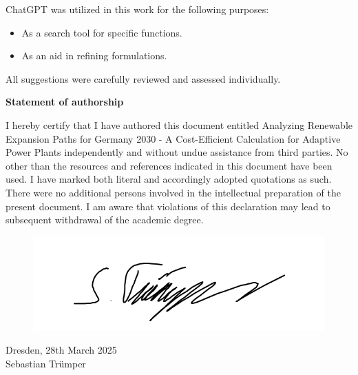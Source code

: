 ChatGPT was utilized in this work for the following purposes:
\begin{itemize}
    \item As a search tool for specific functions.
    \item As an aid in refining formulations.
\end{itemize}
All suggestions were carefully reviewed and assessed individually.
    


\begin{center}
\textbf{Statement of authorship}
\end{center}

I hereby certify that I have authored this document entitled Analyzing Renewable Expansion
Paths for Germany 2030 - A Cost-Efficient Calculation for Adaptive Power Plants independently
and without undue assistance from third parties. No other than the resources and references
indicated in this document have been used. I have marked both literal and accordingly adopted
quotations as such. There were no additional persons involved in the intellectual preparation
of the present document. I am aware that violations of this declaration may lead to subsequent
withdrawal of the academic degree.\\

\begin{figure}[!h]
    \includegraphics[width=0.5\linewidth]{figures/unterschrift.png}
\end{figure}
Dresden, 28th March 2025\\
Sebastian Trümper\\